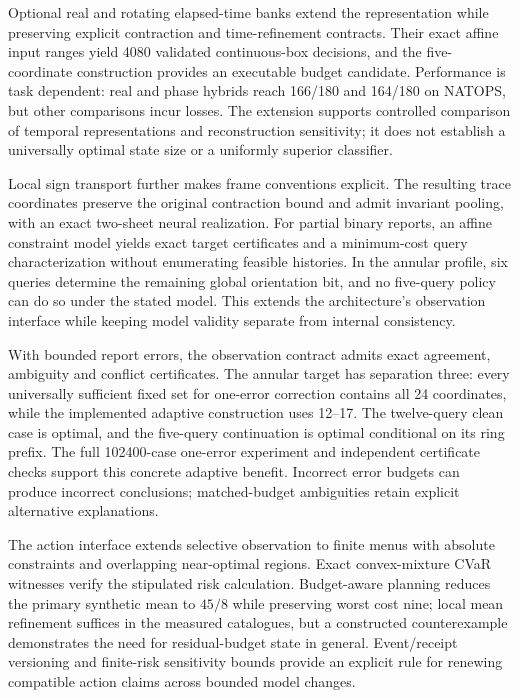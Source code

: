 \documentclass[11pt,a4paper]{article}
\theoremstyle{definition}\newtheorem{definition}[theorem]{Definition}
\begin{document}
Optional real and rotating elapsed-time banks extend the representation while preserving explicit contraction and time-refinement contracts. Their exact affine input ranges yield 4080 validated continuous-box decisions, and the five-coordinate construction provides an executable budget candidate. Performance is task dependent: real and phase hybrids reach 166/180 and 164/180 on NATOPS, but other comparisons incur losses. The extension supports controlled comparison of temporal representations and reconstruction sensitivity; it does not establish a universally optimal state size or a uniformly superior classifier.

Local sign transport further makes frame conventions explicit. The resulting trace coordinates preserve the original contraction bound and admit invariant pooling, with an exact two-sheet neural realization. For partial binary reports, an affine constraint model yields exact target certificates and a minimum-cost query characterization without enumerating feasible histories. In the annular profile, six queries determine the remaining global orientation bit, and no five-query policy can do so under the stated model. This extends the architecture's observation interface while keeping model validity separate from internal consistency.

With bounded report errors, the observation contract admits exact agreement, ambiguity and conflict certificates. The annular target has separation three: every universally sufficient fixed set for one-error correction contains all 24 coordinates, while the implemented adaptive construction uses 12--17. The twelve-query clean case is optimal, and the five-query continuation is optimal conditional on its ring prefix. The full 102400-case one-error experiment and independent certificate checks support this concrete adaptive benefit. Incorrect error budgets can produce incorrect conclusions; matched-budget ambiguities retain explicit alternative explanations.

The action interface extends selective observation to finite menus with absolute constraints and overlapping near-optimal regions. Exact convex-mixture CVaR witnesses verify the stipulated risk calculation. Budget-aware planning reduces the primary synthetic mean to $45/8$ while preserving worst cost nine; local mean refinement suffices in the measured catalogues, but a constructed counterexample demonstrates the need for residual-budget state in general. Event/receipt versioning and finite-risk sensitivity bounds provide an explicit rule for renewing compatible action claims across bounded model changes.
\end{document}

